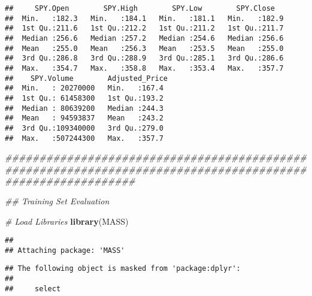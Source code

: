 \documentclass[
]{article}
\newenvironment{Shaded}{\begin{snugshade}}{\end{snugshade}}
\newcommand{\CommentTok}[1]{\textcolor[rgb]{0.56,0.35,0.01}{\textit{#1}}}
\newcommand{\KeywordTok}[1]{\textcolor[rgb]{0.13,0.29,0.53}{\textbf{#1}}}
\newcommand{\NormalTok}[1]{#1}
\newcommand{\OperatorTok}[1]{\textcolor[rgb]{0.81,0.36,0.00}{\textbf{#1}}}
\begin{document}
\begin{verbatim}
##     SPY.Open        SPY.High        SPY.Low        SPY.Close    
##  Min.   :182.3   Min.   :184.1   Min.   :181.1   Min.   :182.9  
##  1st Qu.:211.6   1st Qu.:212.2   1st Qu.:211.2   1st Qu.:211.7  
##  Median :256.6   Median :257.2   Median :254.6   Median :256.6  
##  Mean   :255.0   Mean   :256.3   Mean   :253.5   Mean   :255.0  
##  3rd Qu.:286.8   3rd Qu.:288.9   3rd Qu.:285.1   3rd Qu.:286.6  
##  Max.   :354.7   Max.   :358.8   Max.   :353.4   Max.   :357.7  
##    SPY.Volume        Adjusted_Price 
##  Min.   : 20270000   Min.   :167.4  
##  1st Qu.: 61458300   1st Qu.:193.2  
##  Median : 80639200   Median :244.3  
##  Mean   : 94593837   Mean   :243.2  
##  3rd Qu.:109340000   3rd Qu.:279.0  
##  Max.   :507244300   Max.   :357.7
\end{verbatim}

\begin{Shaded}
\begin{Highlighting}[]
\CommentTok{###########################################################################################################}

\CommentTok{## Training Set Evaluation}
    
  \CommentTok{# Load Libraries}
    \KeywordTok{library}\NormalTok{(MASS)}
\end{Highlighting}
\end{Shaded}

\begin{verbatim}
## 
## Attaching package: 'MASS'
\end{verbatim}

\begin{verbatim}
## The following object is masked from 'package:dplyr':
## 
##     select
\end{verbatim}

\begin{Shaded}
\end{Shaded}
\end{document}
